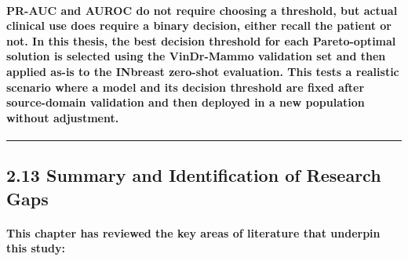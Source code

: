 \paragraph{PR-AUC and AUROC do not require choosing a threshold, but actual clinical use does require a binary decision, either recall the patient or not. In this thesis, the best decision threshold for each Pareto-optimal solution is selected using the VinDr-Mammo validation set and then applied as-is to the INbreast zero-shot evaluation. This tests a realistic scenario where a model and its decision threshold are fixed after source-domain validation and then deployed in a new population without adjustment.}

\begin{center}\rule{0.5\linewidth}{0.5pt}\end{center}

\subsection{2.13 Summary and Identification of Research
Gaps}\label{summary-and-identification-of-research-gaps}

\paragraph{This chapter has reviewed the key areas of literature that underpin this study:}

